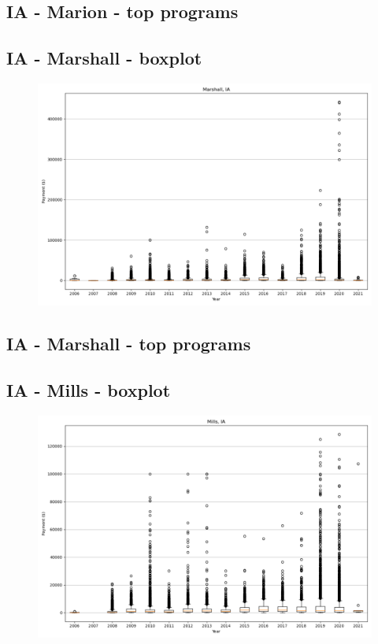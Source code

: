 \subsection*{IA - Marion - top programs}

\newpage
\subsection*{IA - Marshall - boxplot}
\begin{figure}[h]
\centering
\includegraphics[width=7in]{../output/boxplots/counties/Marshall-IA_boxplot.png}
\end{figure}


\subsection*{IA - Marshall - top programs}

\newpage
\subsection*{IA - Mills - boxplot}
\begin{figure}[h]
\centering
\includegraphics[width=7in]{../output/boxplots/counties/Mills-IA_boxplot.png}
\end{figure}


